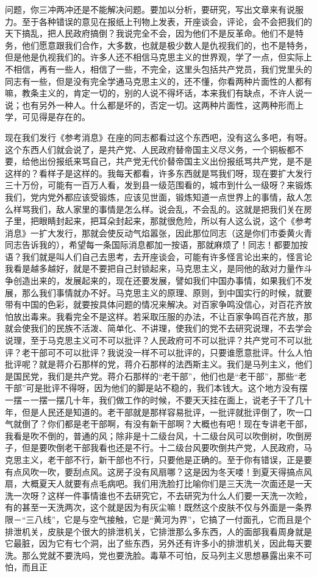 问题，你三冲两冲还是不能解决问题。要加以分析，要研究，写出文章来有说服力。至于各种错误的意见在报纸上刊物上发表，开座谈会，评论，会不会把我们的天下搞乱，把人民政府搞倒？我说完全不会，因为他们不是反革命。他们不是特务，他们愿意跟我们合作，大多数，也就是极少数人是仇视我们的，也不是特务，但是他是仇视我们的。许多人还不相信马克思主义的世界观，学了一点，但实际上不相信，再有一些人，相信了一些，不完全，这里头包括共产党员，我们党里头的同志有一些，但是没有完全学通马克思主义的，还不懂，你看两种片面性的人都有嘛，教条主义的，肯定一切的，别的人说不得坏话，本来我们有缺点，不许人说一说；也有另外一种人。什么都是坏的，否定一切。这两种片面性，这两种形而上学，可见得是存在的。

现在我们发行《参考消息》在座的同志都看过这个东西吧，没有这么多吧，有呀。这个东西人们就会说了，是共产党、人民政府替帝国主义尽义务，一个铜板都不要，给他出份报纸来骂自己，共产党无代价替帝国主义出份报纸骂共产党，是不是这样的？看样子是这样的。我每天都看，许多东西就是骂我们呀，现在要扩大发行三十万份，可能有一百万人看，发到县一级范围看的，城市到什么一级呀？来锻炼我们，党内党外都应该受锻炼，应该见世面，锻炼知道一点世界上的事情，敌人怎么样骂我们，敌人家里的事情是怎么样。说会乱，不会乱的。这就是把我们关在房子里，把眼睛封起来，把耳朵封起来，那就很危险，所以有人这么说，这个《参考消息》一扩大发行，那就会使反动气焰嚣张，因此那位同志（这是你们市委黄火青同志告诉我的），希望每一条国际消息都加一按语，那就麻烦了！同志！都要加按语？我们就是叫人们自己去思考，去开座谈会，可能有许多怪言论出来的，怪言论我看是越多越好，就是不要把自己封锁起来，马克思主义，是同他的敌对力量作斗争创造出来的，发展起来的，现在还要发展，譬如我们中国办事情，如果我们不发展，那么我们事情就办不好。马克思主义的原理、原则，到中国实行的时候，就要带有中国的色彩，就要按具体问题的情况来解决。对百家争鸣没信心，对百花齐放怕放出毒来。我看完全不是这样。若采取压服的办法，不让百家争鸣百花齐放，那就会使我们的民族不活泼、简单化、不讲理，使我们的党不去研究说理，不去学会说理，至于马克思主义可不可以批评？人民政府可不可以批评？共产党可不可以批评？老干部可不可以批评？我说没一样不可以批评的，只要谁愿意批评。什么人怕批评呢？就是蒋介石那样的党，蒋介石那样的法西斯主义。我们是马列主义，他们是国民党，我们是共产党。蒋介石那样的“老干部”，他们也是“老干部”，那些“老干部”可是批评不得呀，因为他们的脚是站不稳的，我们本钱大。这个地方没有摆一摆－一摆一摆几十年，我们做工作的时候，不要天天挂在面上，说老子干了几十年，但是人民还是知道的。老干部就是那样容易批评，一批评就批评倒了，吹一口气就倒了？你们都是老干部啊，有没有新干部啊？大概也有吧！现在专讲老干部，我看是吹不倒的，普通的风；除非是十二级台风，十二级台风可以吹倒树，吹倒房子，但是要吹倒老干部我看也还是不行。十二级台风要吹倒共产党，人民政府，马克思主义，老干部不行，新干部也不行，只要他是正确的。至于你有错误，正是要有点风吹一吹，要刮点风。这房子没有风扇哪？这是因为冬天喽！到夏天得搞点风扇，大概夏天人就要有点毛病吧。我们用洗脸打比喻你们是三天洗一次面还是一天洗一次呀？这样一件事情谁也不去研究它，不去研究为什么人们要一天洗一次睑，有的甚至一天洗两次，这个就是因为有灰尘嘛！既然这个皮肤不仅与外面是一条界限－“三八线”，它是与空气接触，它是“黄河为界”，它搞了一付面孔，它而且是个排泄机关，皮肤是个很大的排泄机关，它排泄那么多东西，人的面部我看周身就是它最脏，因为它有七个洞，出了些东西，另外还有许多小的排泄机关，因此每天要洗。那么党就不要洗吗，党也要洗脸。毒草不可怕，反马列主义思想暴露出来不可怕，而且正